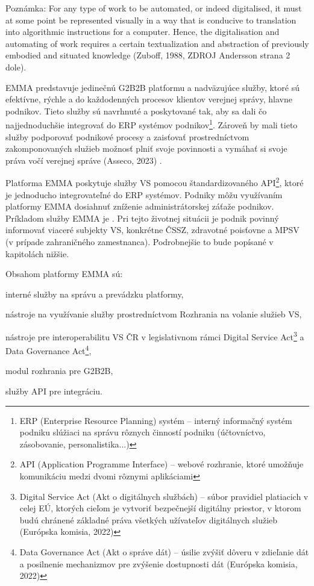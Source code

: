 \TODO
Poznámka: 
For any type of work to be automated, or indeed digitalised, it must
at some point be represented visually in a way that is conducive to
translation into algorithmic instructions for a computer. Hence, the
digitalisation and automating of work requires a certain textualization
and abstraction of previously embodied and situated knowledge (Zuboff, 1988, ZDROJ Andersson strana 2 dole).


EMMA predstavuje jedinečnú G2B2B platformu a nadväzujúce služby, ktoré sú efektívne, rýchle a  do každodenných procesov klientov verejnej správy, hlavne podnikov. Tieto služby sú navrhnuté a poskytované tak, aby sa dali čo najjednoduchšie integrovať do ERP systémov podnikov\footnote{ERP (Enterprise Resource Planning) systém -- interný informačný systém podniku slúžiaci na správu rôznych činností podniku (účtovníctvo, zásobovanie, personalistika...)}. Zároveň by mali tieto služby podporovať podnikové procesy a zaisťovať prostredníctvom zakomponovaných služieb možnosť plniť svoje povinnosti a vymáhať si svoje práva vočí verejnej správe \scr(Asseco, 2023) .

Platforma EMMA poskytuje služby VS pomocou štandardizovaného API\footnote{API (Application Programme Interface) -- webové rozhranie, ktoré umožňuje komunikáciu medzi dvomi rôznymi aplikáciami}, ktoré je jednoducho integrovateľné do ERP systémov. Podniky môžu využívaním platformy EMMA dosiahnuť zníženie administrátorskej záťaže podnikov. Príkladom služby EMMA je . Pri tejto životnej situácii je podnik povinný informovať viaceré subjekty VS, konkrétne ČSSZ, zdravotné poisťovne a MPSV (v prípade zahraničného zamestnanca). Podrobnejšie to bude popísané v kapitolách nižšie.

Obsahom platformy EMMA sú:

\startitemize
\item{interné služby na správu a prevádzku platformy,}
\item{nástroje na využívanie služby prostredníctvom Rozhrania na volanie služieb VS,}
\item{nástroje pre interoperabilitu VS ČR v legislativnom rámci Digital Service Act\footnote{Digital Service Act (Akt o digitálnych službách) -- súbor pravidiel platiacich v celej EÚ, ktorých cieľom je vytvoriť bezpečnejší digitálny priestor, v ktorom budú chránené základné práva všetkých užívateľov digitálnych služieb \scr(Európska komisia, 2022)} a Data Governance Act\footnote{Data Governance Act (Akt o správe dát) -- úsilie zvýšiť dôveru v zdieľanie dát a posilnenie mechanizmov pre zvýšenie dostupnosti dát \scr(Európska komisia, 2022)},}
\item{modul rozhrania pre G2B2B,}
\item{služby API pre integráciu.}
\stopitemize 

